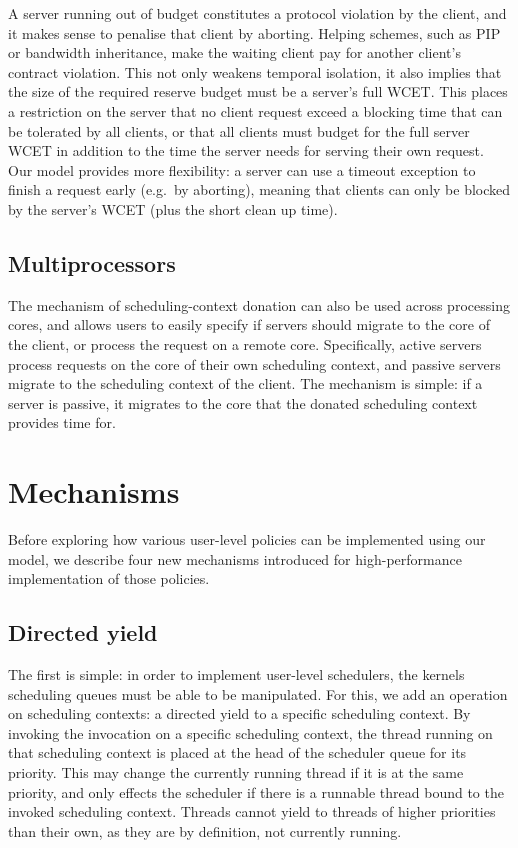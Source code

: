 A server running out of budget constitutes a protocol violation
by the client, and it makes sense to penalise that
client by aborting. Helping schemes, such as \gls{PIP} or bandwidth
inheritance,
make the waiting client pay for
another client's contract violation. This not only weakens temporal isolation,
it also implies that the size of the required reserve budget
must be a server's full WCET. This places a restriction on the server
that no client request exceed a blocking time that can be tolerated by
all clients, or that all clients must budget for the full server WCET in
addition to the time the server needs for serving their own request.
Our model provides more flexibility: a server can use a timeout
exception to finish a request early (e.g.\ by aborting), meaning that clients can only be
blocked by the server's \gls{WCET} (plus the short
clean up time).

\subsection{Multiprocessors}

The mechanism of scheduling-context donation can also be used across processing cores, and 
allows users to easily specify if servers should migrate to the core of the client, or 
process the request on a remote core. Specifically, active servers process requests on the core of
their own scheduling context, and passive servers migrate to the scheduling context of the client. 
The mechanism is simple: if a
server is passive, it migrates to the core that the donated scheduling context provides time for. 

\section{Mechanisms}
\label{sec:model-mechanisms}

Before exploring how various user-level policies can be implemented using our model, we describe
four new mechanisms introduced for high-performance implementation of those policies.

\subsection{Directed yield}

The first is simple: in order to implement user-level schedulers, the kernels scheduling queues
must be able to be manipulated. For this, we add an operation on scheduling contexts: a
directed yield to a specific scheduling context. By invoking the \scyieldto invocation on 
a specific scheduling context, the thread running on that scheduling context is placed at the head
of the scheduler queue for its priority. 
This may change the currently running thread if it is at the same priority, and only effects the
scheduler if there is a runnable thread bound to the invoked scheduling context. Threads cannot
yield to threads of higher priorities than their own, as they are by definition, not currently
running.

